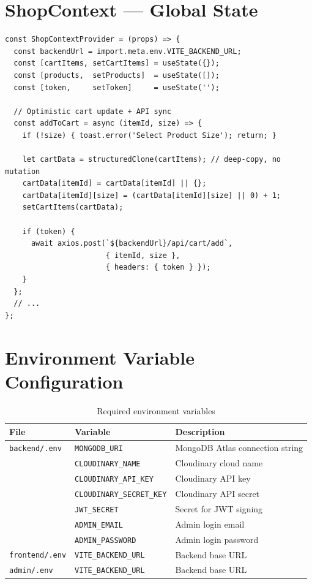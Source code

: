 \documentclass[12pt,a4paper]{report}
\begin{document}
\section{ShopContext — Global State}

\begin{lstlisting}[caption={ShopContext.jsx — selected excerpt}, label=lst:context]
const ShopContextProvider = (props) => {
  const backendUrl = import.meta.env.VITE_BACKEND_URL;
  const [cartItems, setCartItems] = useState({});
  const [products,  setProducts]  = useState([]);
  const [token,     setToken]     = useState('');

  // Optimistic cart update + API sync
  const addToCart = async (itemId, size) => {
    if (!size) { toast.error('Select Product Size'); return; }

    let cartData = structuredClone(cartItems); // deep-copy, no mutation
    cartData[itemId] = cartData[itemId] || {};
    cartData[itemId][size] = (cartData[itemId][size] || 0) + 1;
    setCartItems(cartData);

    if (token) {
      await axios.post(`${backendUrl}/api/cart/add`,
                       { itemId, size },
                       { headers: { token } });
    }
  };
  // ...
};
\end{lstlisting}

\section{Environment Variable Configuration}

\begin{table}[H]
  \centering
  \caption{Required environment variables}
  \label{tab:env}
  \begin{tabular}{lll}
    \toprule
    \textbf{File} & \textbf{Variable} & \textbf{Description} \\
    \midrule
    \texttt{backend/.env} & \texttt{MONGODB\_URI}          & MongoDB Atlas connection string \\
                          & \texttt{CLOUDINARY\_NAME}      & Cloudinary cloud name \\
                          & \texttt{CLOUDINARY\_API\_KEY}  & Cloudinary API key \\
                          & \texttt{CLOUDINARY\_SECRET\_KEY} & Cloudinary API secret \\
                          & \texttt{JWT\_SECRET}           & Secret for JWT signing \\
                          & \texttt{ADMIN\_EMAIL}          & Admin login email \\
                          & \texttt{ADMIN\_PASSWORD}       & Admin login password \\
    \midrule
    \texttt{frontend/.env} & \texttt{VITE\_BACKEND\_URL}  & Backend base URL \\
    \texttt{admin/.env}    & \texttt{VITE\_BACKEND\_URL}  & Backend base URL \\
    \bottomrule
  \end{tabular}
\end{table}
\end{document}
